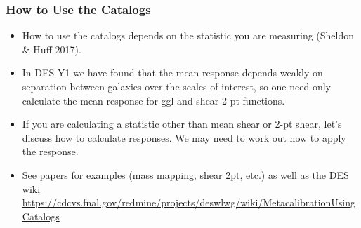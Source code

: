 \documentclass{beamer}
\begin{document}
\frame
{
    \frametitle{How to Use the Catalogs}

 
    \begin{itemize}

        \item How to use the catalogs depends on the statistic you are measuring
            (Sheldon \& Huff 2017).

        \item In DES Y1 we have found that the mean response depends weakly on
            separation between galaxies over the scales of interest, so one
            need only calculate the mean response for ggl and shear 2-pt
            functions.

        \item If you are calculating a statistic other than mean shear or
            2-pt shear, let's discuss how to calculate responses.  We may
            need to work out how to apply the response.

        \item See papers for examples (mass mapping, shear 2pt, etc.) as well
            as the DES wiki
            \url{https://cdcvs.fnal.gov/redmine/projects/deswlwg/wiki/MetacalibrationUsingCatalogs}

    \end{itemize}
}
\end{document}
